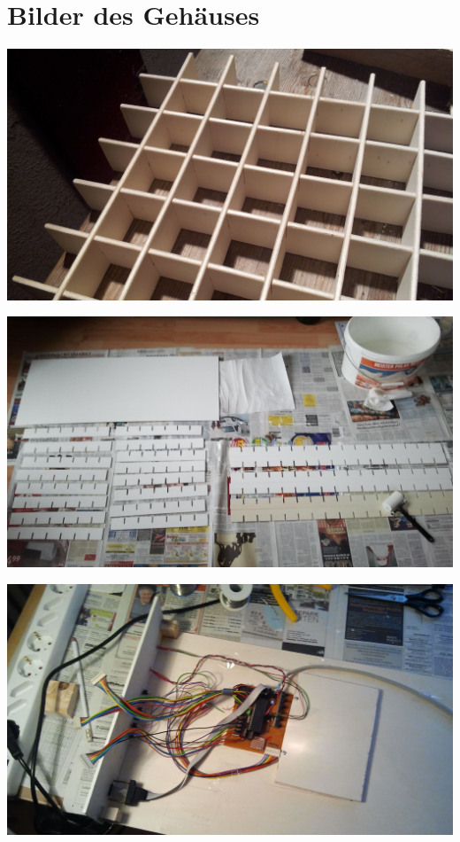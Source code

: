 \section{Bilder des Gehäuses}\label{sec_gehaeusebilder}
%
\vspace{5ex}
\centerline{\includegraphics[width=\linewidth]{images/gehaeuse1.jpg}}
\label{fig_gehaeuse1}
\vfill
\centerline{\includegraphics[width=\linewidth]{images/gehaeuse2.jpg}}
\label{fig_gehaeuse2}
%
\newpage
\centerline{\includegraphics[width=\linewidth]{images/gehaeuse3.jpg}}
